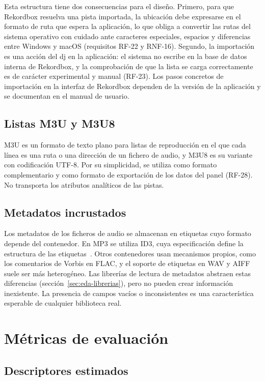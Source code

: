 Esta estructura tiene dos consecuencias para el diseño. Primero, para que Rekordbox resuelva una pista importada, la ubicación debe expresarse en el formato de ruta que espera la aplicación, lo que obliga a convertir las rutas del sistema operativo con cuidado ante caracteres especiales, espacios y diferencias entre Windows y macOS (requisitos RF-22 y RNF-16). Segundo, la importación es una acción del \acs{dj} en la aplicación: el sistema no escribe en la base de datos interna de Rekordbox, y la comprobación de que la lista se carga correctamente es de carácter experimental y manual (RF-23). Los pasos concretos de importación en la interfaz de Rekordbox dependen de la versión de la aplicación y se documentan en el manual de usuario.

\subsection{Listas M3U y M3U8}

M3U es un formato de texto plano para listas de reproducción en el que cada línea es una ruta o una dirección de un fichero de audio, y M3U8 es su variante con codificación UTF-8. Por su simplicidad, se utiliza como formato complementario y como formato de exportación de los datos del panel (RF-28). No transporta los atributos analíticos de las pistas.

\subsection{Metadatos incrustados}

Los metadatos de los ficheros de audio se almacenan en etiquetas cuyo formato depende del contenedor. En MP3 se utiliza ID3, cuya especificación define la estructura de las etiquetas~\cite{id3v24}. Otros contenedores usan mecanismos propios, como los comentarios de Vorbis en FLAC, y el soporte de etiquetas en WAV y AIFF suele ser más heterogéneo. Las librerías de lectura de metadatos abstraen estas diferencias (sección~\ref{sec:eda-librerias}), pero no pueden crear información inexistente. La presencia de campos vacíos o inconsistentes es una característica esperable de cualquier biblioteca real.

\section{Métricas de evaluación}
\label{sec:fund-metricas}

\subsection{Descriptores estimados}

